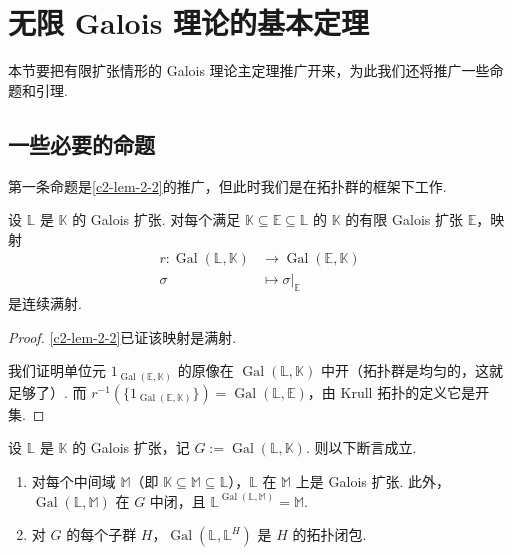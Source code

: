 \section{无限 Galois 理论的基本定理}

本节要把有限扩张情形的 Galois 理论主定理推广开来，为此我们还将推广一些命题和引理.

\subsection{一些必要的命题}

第一条命题是\autoref{c2-lem-2-2}的推广，但此时我们是在拓扑群的框架下工作.

\begin{proposition}\label{c2-prop-3-1}
设 $\mathbb{L}$ 是 $\mathbb{K}$ 的 Galois 扩张. 对每个满足 $\mathbb{K}\subseteq\mathbb{E}\subseteq\mathbb{L}$ 的 $\mathbb{K}$ 的有限 Galois 扩张 $\mathbb{E}$，映射
\[
\begin{aligned}
r:\operatorname{Gal}(\mathbb{L},\mathbb{K})&\longrightarrow\operatorname{Gal}(\mathbb{E},\mathbb{K})\\
\sigma&\longmapsto\sigma|_{\mathbb{E}}
\end{aligned}
\]
是连续满射.
\end{proposition}

\begin{proof}
\autoref{c2-lem-2-2}已证该映射是满射.

我们证明单位元 $1_{\operatorname{Gal}(\mathbb{E},\mathbb{K})}$ 的原像在 $\operatorname{Gal}(\mathbb{L},\mathbb{K})$ 中开（拓扑群是均匀的，这就足够了）. 而 $r^{-1}(\{1_{\operatorname{Gal}(\mathbb{E},\mathbb{K})}\})=\operatorname{Gal}(\mathbb{L},\mathbb{E})$，由 Krull 拓扑的定义它是开集.
\end{proof}

\begin{proposition}\label{c2-prop-3-2}
设 $\mathbb{L}$ 是 $\mathbb{K}$ 的 Galois 扩张，记 $G:=\operatorname{Gal}(\mathbb{L},\mathbb{K})$. 则以下断言成立.
\begin{enumerate}
    \item 对每个中间域 $\mathbb{M}$（即 $\mathbb{K}\subseteq\mathbb{M}\subseteq\mathbb{L}$），$\mathbb{L}$ 在 $\mathbb{M}$ 上是 Galois 扩张. 此外，$\operatorname{Gal}(\mathbb{L},\mathbb{M})$ 在 $G$ 中闭，且 $\mathbb{L}^{\operatorname{Gal}(\mathbb{L},\mathbb{M})}=\mathbb{M}$.
    \item 对 $G$ 的每个子群 $H$，$\operatorname{Gal}(\mathbb{L},\mathbb{L}^{H})$ 是 $H$ 的拓扑闭包.
\end{enumerate}
\end{proposition}

